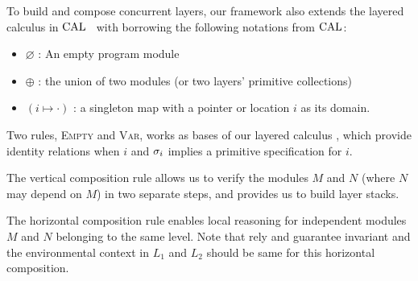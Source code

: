 To build and compose concurrent layers, 
our framework also extends the layered calculus in $\calname$~\cite{deepspec} with 
borrowing the following notations 
from $\calname$:
\begin{itemize}
\item $\varnothing$ : An  empty program module
\item $\oplus$ : the union of two modules (or two layers' primitive collections)
\item $(i\mapsto \cdot)$ : a singleton map with a pointer or location $i$ as its domain.
\end{itemize}

Two rules, \textsc{Empty} and \textsc{Var}, works as bases of our layered calculus , which 
provide identity relations when $i$ and  $\spec_i$ implies a primitive specification for $i$.

The vertical composition rule allows us
to verify the modules $M$ and $N$ (where $N$ may depend on $M$) 
in two separate steps, and provides us to build layer stacks.
    \begin{mathpar}
\end{mathpar}

The horizontal composition rule enables local reasoning for independent
modules $M$ and $N$ belonging to the same level. Note that rely and guarantee invariant and the environmental context in $L_1$ and $L_2$ should 
be same for this horizontal composition.
 \begin{mathpar}
\end{mathpar}


